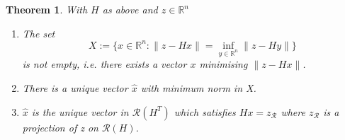 \documentclass[a4paper]{article}
\theoremstyle{break}
\newtheorem{theorem}{Theorem}[section]
\newcommand{\R}{\mathbb{R}}
\newcommand{\Ra}{\mathcal{R}}
\begin{document}
\begin{theorem}
With $H$ as above and $z \in \R^n$
\begin{enumerate}
    \item The set
        \begin{equation*}
        X := \{ x \in \R^n : \| z - H x \| = \inf\limits_{y \in \R^n} \| z - H y \| \}
        \end{equation*}
        is not empty, i.e. there exists a vector $x$ minimising $\| z - H x \|$.
    \item There is a unique vector $\hat{x}$ with minimum norm in X.
    \item $\hat{x}$ is the unique vector in $\Ra(H^T)$ which satisfies $ H x = z_\Ra $ where $ z_\Ra $ is a projection of z on $ \Ra(H) $.
\end{enumerate}

\end{theorem}
\end{document}
